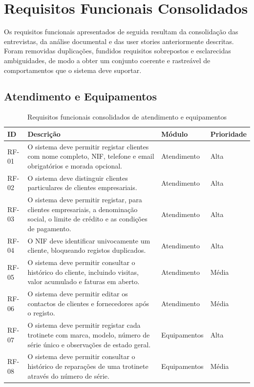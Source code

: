 \documentclass[a4paper,12pt]{scrreprt}
\begin{document}
    \section{Requisitos Funcionais Consolidados}
        Os requisitos funcionais apresentados de seguida resultam da consolidação das entrevistas, da análise documental e das user stories anteriormente descritas. Foram removidas duplicações, fundidos requisitos sobrepostos e esclarecidas ambiguidades, de modo a obter um conjunto coerente e rastreável de comportamentos que o sistema deve suportar.

        \subsection{Atendimento e Equipamentos}
        \begin{table}[H]
            \centering
            \small
            \begin{tabular}{|p{1.4cm}|p{8.9cm}|p{2.5cm}|p{2.1cm}|}
                \hline
                \rowcolor{gray!20!white}
                \textbf{ID} & \textbf{Descrição} & \textbf{Módulo} & \textbf{Prioridade} \\
                \hline
                RF-01 & O sistema deve permitir registar clientes com nome completo, NIF, telefone e email obrigatórios e morada opcional. & Atendimento & Alta \\
                \hline
                RF-02 & O sistema deve distinguir clientes particulares de clientes empresariais. & Atendimento & Alta \\
                \hline
                RF-03 & O sistema deve permitir registar, para clientes empresariais, a denominação social, o limite de crédito e as condições de pagamento. & Atendimento & Alta \\
                \hline
                RF-04 & O NIF deve identificar univocamente um cliente, bloqueando registos duplicados. & Atendimento & Alta \\
                \hline
                RF-05 & O sistema deve permitir consultar o histórico do cliente, incluindo visitas, valor acumulado e faturas em aberto. & Atendimento & Média \\
                \hline
                RF-06 & O sistema deve permitir editar os contactos de clientes e fornecedores após o registo. & Atendimento & Média \\
                \hline
                RF-07 & O sistema deve permitir registar cada trotinete com marca, modelo, número de série único e observações de estado geral. & Equipamentos & Alta \\
                \hline
                RF-08 & O sistema deve permitir consultar o histórico de reparações de uma trotinete através do número de série. & Equipamentos & Média \\
                \hline
            \end{tabular}
            \caption{Requisitos funcionais consolidados de atendimento e equipamentos}
        \end{table}
\end{document}
